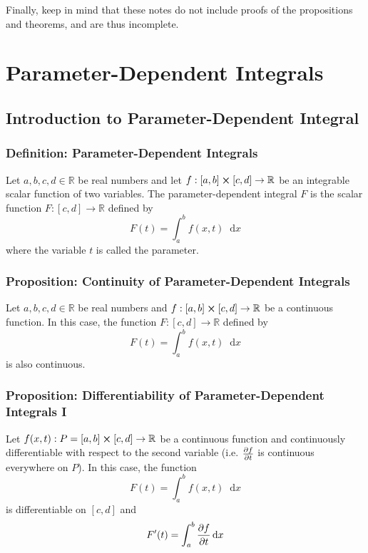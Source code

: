 \documentclass[11pt, a4paper]{article}
\newcommand{\diff}{\mathop{}\!\mathrm{d}} %
\begin{document}
\vspace{2mm}
Finally, keep in mind that these notes do not include proofs of the propositions and theorems, and are thus incomplete.

 \newpage

\tableofcontents

\newpage

\section{Parameter-Dependent Integrals}

\subsection{Introduction to Parameter-Dependent Integral}

\subsubsection{Definition: Parameter-Dependent Integrals}
Let $ a, b, c, d \in \mathbb{R}$ be real numbers and let $ f : [a, b] \cross [c, d] \rightarrow \mathbb{R}$ be an integrable scalar function of two variables. The parameter-dependent integral $ F $ is the scalar function $ F : [c, d] \rightarrow \mathbb{R} $ defined by 
\begin{equation*}
F(t) = \int_{a}^{b}f(x, t) \diff x
\end{equation*}
where the variable $ t $ is called the parameter.



\subsubsection{Proposition: Continuity of Parameter-Dependent Integrals}
Let $ a, b, c, d \in \mathbb{R}$ be real numbers and $ f : [a, b] \cross [c, d] \rightarrow \mathbb{R}$ be a continuous function. In this case, the function $ F : [c, d] \rightarrow \mathbb{R} $ defined by 
\begin{equation*}
F(t) = \int_{a}^{b}f(x, t) \diff x
\end{equation*}
is also continuous.


\subsubsection{Proposition: Differentiability of Parameter-Dependent Integrals I}
Let $ f(x, t) : P = [a, b] \cross [c, d] \rightarrow \mathbb{R}$ be a continuous function and continuously differentiable with respect to the second variable (i.e. $ \pdv{f}{t} $ is continuous everywhere on $ P $). In this case, the function 
\begin{equation*}
F(t) = \int_{a}^{b}f(x, t) \diff x
\end{equation*}
is differentiable on $ [c, d] $ and
\begin{equation*}
F'(t) = \int_{a}^{b}\pdv{f}{t} (x, t) \diff x
\end{equation*}
\end{document}
